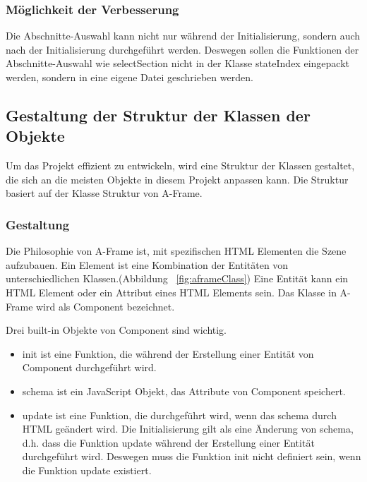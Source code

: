   \subsubsection{Möglichkeit der Verbesserung}
  Die Abschnitte-Auswahl kann nicht nur während der Initialisierung, sondern auch nach der Initialisierung durchgeführt werden. Deswegen sollen die Funktionen der Abschnitte-Auswahl wie {\selectfont selectSection} nicht in der Klasse {\selectfont stateIndex} eingepackt werden, sondern in eine eigene Datei geschrieben werden.
  
 \subsection{Gestaltung der Struktur der Klassen der Objekte}
 Um das Projekt effizient zu entwickeln, wird eine Struktur der Klassen gestaltet, die sich an die meisten Objekte in diesem Projekt anpassen kann. Die Struktur basiert auf der Klasse Struktur von A-Frame.
 
 \subsubsection{Gestaltung}
 Die Philosophie von A-Frame ist, mit spezifischen HTML Elementen die Szene aufzubauen. Ein Element ist eine Kombination der Entitäten von unterschiedlichen Klassen.(Abbildung ~\ref{fig:aframeClass}) Eine Entität kann ein HTML Element oder ein Attribut eines HTML Elements sein. Das Klasse in A-Frame wird als Component bezeichnet.
 
 Drei built-in Objekte von Component sind wichtig.
 \begin{itemize}
     \item {\selectfont init} ist eine Funktion, die während der Erstellung einer Entität von Component durchgeführt wird.
     \item {\selectfont schema} ist ein JavaScript Objekt, das Attribute von Component speichert.
     \item {\selectfont update} ist eine Funktion, die durchgeführt wird, wenn das schema durch HTML geändert wird. Die Initialisierung gilt als eine Änderung von schema, d.h. dass die Funktion update während der Erstellung einer Entität durchgeführt wird. Deswegen muss die Funktion {\selectfont init} nicht definiert sein, wenn die Funktion update existiert.
 \end{itemize}
 
